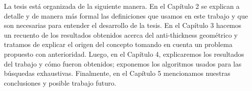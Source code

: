 La tesis está organizada de la siguiente manera. En el Capítulo 2 se explican
a detalle y de manera más formal las definiciones que usamos en este trabajo y que
son necesarias para entender el desarrollo de la tesis. En el Capítulo 3 hacemos un recuento de los
resultados obtenidos acerca del anti-thickness geométrico y tratamos de explicar el origen del concepto
tomando en cuenta un problema propuesto con anterioridad. Luego, en el Capítulo 4, explicaremos los
resultados del trabajo y cómo fueron obtenidos; exponemos los algoritmos usados para las
búsquedas exhaustivas. Finalmente, en el Capítulo 5 mencionamos nuestras conclusiones y posible trabajo
futuro.
